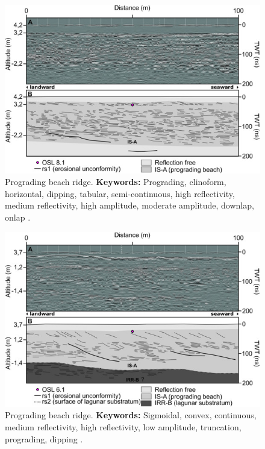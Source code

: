 \begin{figure}[h!]
    \centering
    \includegraphics[width=0.8\linewidth]{Figures/0.2GPR/Figueiredo2021-gr4.jpg}
    \caption[Prograding beach ridge.]{Prograding beach ridge. \textbf{Keywords: } Prograding, clinoform, horizontal, dipping, tabular, semi-continuous, high reflectivity, medium reflectivity, high amplitude, moderate amplitude, downlap, onlap \citep{Figueiredo2021}.}
    \label{fig:Figueiredo2021-4}
\end{figure}

\begin{figure}[h!]
    \centering
    \includegraphics[width=0.8\linewidth]{Figures/0.2GPR/Figueiredo2021-gr5.jpg}
    \caption[Prograding beach ridge.]{Prograding beach ridge. \textbf{Keywords: } Sigmoidal, convex, continuous, medium reflectivity, high reflectivity, low amplitude, truncation, prograding, dipping \citep{Figueiredo2021}.}
    \label{fig:Figueiredo2021-5}
\end{figure}

